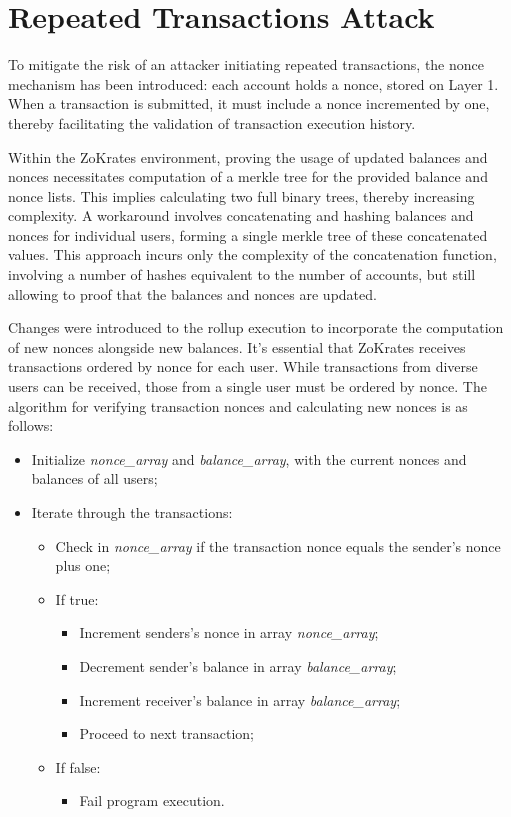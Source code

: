 \section{Repeated Transactions Attack}
\label{sec:repeatedtransactionsattack}

To mitigate the risk of an attacker initiating repeated transactions, the nonce mechanism has been introduced: each account holds a nonce, stored on Layer 1. When a transaction is submitted, it must include a nonce incremented by one, thereby facilitating the validation of transaction execution history.

Within the ZoKrates environment, proving the usage of updated balances and nonces necessitates computation of a merkle tree for the provided balance and nonce lists. This implies calculating two full binary trees, thereby increasing complexity. A workaround involves concatenating and hashing balances and nonces for individual users, forming a single merkle tree of these concatenated values. This approach incurs only the complexity of the concatenation function, involving a number of hashes equivalent to the number of accounts, but still allowing to proof that the balances and nonces are updated.

Changes were introduced to the rollup execution to incorporate the computation of new nonces alongside new balances. It's essential that ZoKrates receives transactions ordered by nonce for each user. While transactions from diverse users can be received, those from a single user must be ordered by nonce. The algorithm for verifying transaction nonces and calculating new nonces is as follows:
\begin{itemize}
	\item Initialize \textit{nonce\_array} and \textit{balance\_array}, with the current nonces and balances of all users;
	\item Iterate through the transactions:
	      \begin{itemize}
		      \item Check in \textit{nonce\_array} if the transaction nonce equals the sender's nonce plus one;
		      \item If true:
		            \begin{itemize}
			            \item Increment senders's nonce in array \textit{nonce\_array};
			            \item Decrement sender's balance in array \textit{balance\_array};
			            \item Increment receiver's balance in array \textit{balance\_array};
			            \item Proceed to next transaction;
		            \end{itemize}
		      \item If false:
		            \begin{itemize}
			            \item Fail program execution.
		            \end{itemize}
	      \end{itemize}
\end{itemize}

